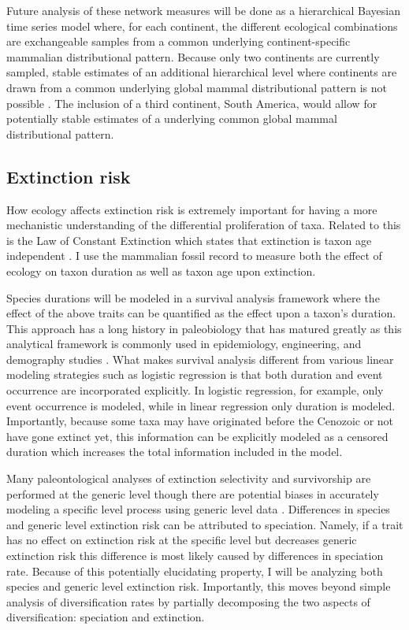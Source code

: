 \documentclass[11pt,letterpaper]{article}
\begin{document}
Future analysis of these network measures will be done as a hierarchical Bayesian time series model where, for each continent, the different ecological combinations are exchangeable samples from a common underlying continent-specific mammalian distributional pattern. Because only two continents are currently sampled, stable estimates of an additional hierarchical level where continents are drawn from a common underlying global mammal distributional pattern is not possible \citep{Gelman2013d}. The inclusion of a third continent, South America, would allow for potentially stable estimates of a underlying common global mammal distributional pattern. %

\subsection{Extinction risk}
How ecology affects extinction risk is extremely important for having a more mechanistic understanding of the differential proliferation of taxa. Related to this is the Law of Constant Extinction which states that extinction is taxon age independent \citep{VanValen1973}. I use the mammalian fossil record to measure both the effect of ecology on taxon duration as well as taxon age upon extinction. 

Species durations will be modeled in a survival analysis framework where the effect of the above traits can be quantified as the effect upon a taxon's duration. This approach has a long history in paleobiology \citep{Simpson1944,Simpson1953,VanValen1973,VanValen1979,Baumiller1993,Foote1988} that has matured greatly as this analytical framework is commonly used in epidemiology, engineering, and demography studies \citep{Kleinbaum2005}. What makes survival analysis different from various linear modeling strategies such as logistic regression is that both duration and event occurrence are incorporated explicitly. In logistic regression, for example, only event occurrence is modeled, while in linear regression only duration is modeled. Importantly, because some taxa may have originated before the Cenozoic or not have gone extinct yet, this information can be explicitly modeled as a censored duration which increases the total information included in the model. 

Many paleontological analyses of extinction selectivity and survivorship are performed at the generic level \citep{Tomiya2013,Liow2008,Harnik2013,Finnegan2008,Foote2006} though there are potential biases in accurately modeling a specific level process using generic level data \citep{Raup1975,Sepkoski1975,Simpson2006,Raup1991a,VanValen1979}. Differences in species and generic level extinction risk can be attributed to speciation. Namely, if a trait has no effect on extinction risk at the specific level but decreases generic extinction risk this difference is most likely caused by differences in speciation rate. Because of this potentially elucidating property, I will be analyzing both species and generic level extinction risk. Importantly, this moves beyond simple analysis of diversification rates by partially decomposing the two aspects of diversification: speciation and extinction.
\end{document}
